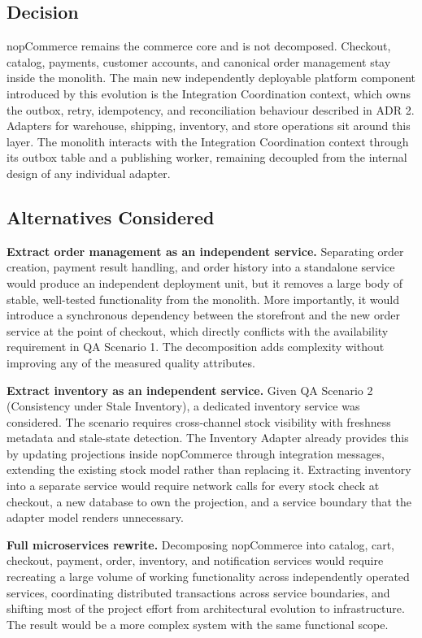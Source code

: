 \subsection{Decision}

nopCommerce remains the commerce core and is not decomposed. Checkout, catalog, payments,
customer accounts, and canonical order management stay inside the monolith. The main new
independently deployable platform component introduced by this evolution is the Integration
Coordination context, which owns the outbox, retry, idempotency, and reconciliation behaviour
described in ADR 2. Adapters for warehouse, shipping, inventory, and store operations sit around this layer.
The monolith interacts with the Integration Coordination context through its outbox table and a
publishing worker, remaining decoupled from the internal design of any individual
adapter.

\subsection{Alternatives Considered}

\textbf{Extract order management as an independent service.} Separating order creation, payment
result handling, and order history into a standalone service would produce an independent
deployment unit, but it removes a large body of stable, well-tested functionality from the
monolith. More importantly, it would introduce a synchronous dependency between the storefront
and the new order service at the point of checkout, which directly conflicts with the
availability requirement in QA Scenario 1. The decomposition adds complexity without improving
any of the measured quality attributes.

\textbf{Extract inventory as an independent service.} Given QA Scenario 2 (Consistency under
Stale Inventory), a dedicated inventory service was considered. The scenario requires
cross-channel stock visibility with freshness metadata and stale-state detection. The Inventory
Adapter already provides this by updating projections inside nopCommerce through integration
messages, extending the existing stock model rather than replacing it. Extracting inventory
into a separate service would require network calls for every stock check at checkout, a new
database to own the projection, and a service boundary that the adapter model renders
unnecessary.

\textbf{Full microservices rewrite.} Decomposing nopCommerce into catalog, cart, checkout,
payment, order, inventory, and notification services would require recreating a large volume of
working functionality across independently operated services, coordinating distributed
transactions across service boundaries, and shifting most of the project effort from
architectural evolution to infrastructure. The result would be a more complex system with the
same functional scope.

